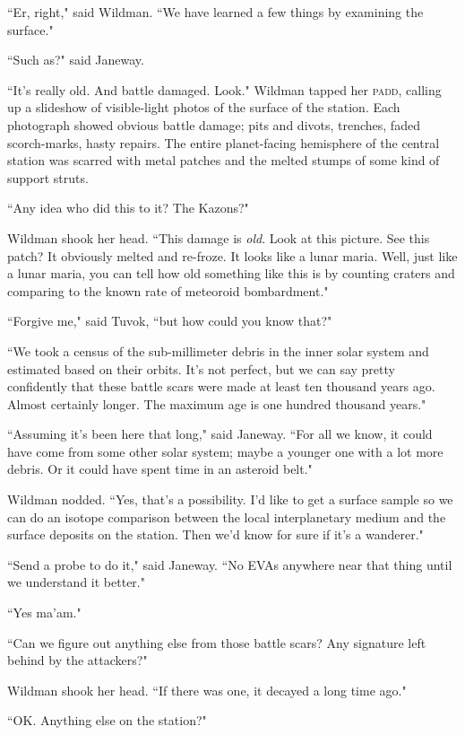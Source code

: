 \documentclass[twoside,letterpaper,12pt]{memoir}
\begin{document}
``Er, right," said Wildman. ``We have learned a few things by examining the surface."

``Such as?" said Janeway.

``It's really old. And battle damaged. Look." Wildman tapped her \textsc{padd}, calling up a slideshow of visible-light photos of the surface of the station. Each photograph showed obvious battle damage; pits and divots, trenches, faded scorch-marks, hasty repairs. The entire planet-facing hemisphere of the central station was scarred with metal patches and the melted stumps of some kind of support struts.

``Any idea who did this to it? The Kazons?"

Wildman shook her head. ``This damage is \textit{old}. Look at this picture. See this patch? It obviously melted and re-froze. It looks like a lunar maria. Well, just like a lunar maria, you can tell how old something like this is by counting craters and comparing to the known rate of meteoroid bombardment."

``Forgive me," said Tuvok, ``but how could you know that?"

``We took a census of the sub-millimeter debris in the inner solar system and estimated based on their orbits. It's not perfect, but we can say pretty confidently that these battle scars were made at least ten thousand years ago. Almost certainly longer. The maximum age is one hundred thousand years."

``Assuming it's been here that long," said Janeway. ``For all we know, it could have come from some other solar system; maybe a younger one with a lot more debris. Or it could have spent time in an asteroid belt."

Wildman nodded. ``Yes, that's a possibility. I'd like to get a surface sample so we can do an isotope comparison between the local interplanetary medium and the surface deposits on the station. Then we'd know for sure if it's a wanderer."

``Send a probe to do it," said Janeway. ``No \textsc{EVA}s anywhere near that thing until we understand it better."

``Yes ma'am."

``Can we figure out anything else from those battle scars? Any signature left behind by the attackers?"

Wildman shook her head. ``If there was one, it decayed a long time ago."

``OK. Anything else on the station?"
\end{document}

